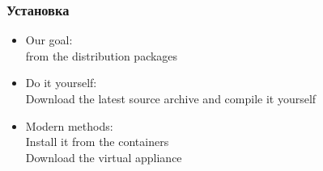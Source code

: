 \begin{frame}[fragile]
    \frametitle{Установка}
        \begin{itemize}
            \item Our goal:  \\
from the distribution packages
            \item Do it yourself: \\
Download the latest source archive and compile it yourself
            \item Modern methods: \\
Install it from the containers \\
Download the virtual appliance
        \end{itemize}
\end{frame}